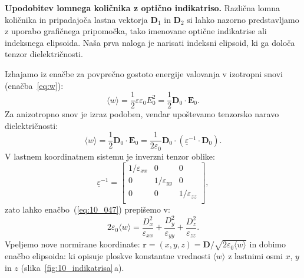 \begin{example}{\bf Upodobitev lomnega količnika z optično indikatriso.} 
\label{ex:ind}
Različna lomna količnika in pripadajoča lastna
vektorja $\mathbf{D}_1$ in $\mathbf{D}_2$ si lahko nazorno predstavljamo z uporabo
grafičnega pripomočka, tako imenovane optične indikatrise ali 
indeksnega elipsoida. Naša prva naloga je narisati indeksni elipsoid, ki ga določa
tenzor dielektričnosti. 

Izhajamo iz enačbe za povprečno gostoto energije valovanja
v izotropni snovi (enačba~\ref{eq:w}):
\begin{equation}
\langle w \rangle = \frac{1}{2} \varepsilon \varepsilon_0 E_0^2 = \frac{1}{2} 
\mathbf{D}_0 \cdot \mathbf{E}_0. 
\label{eq:10_046}
\end{equation}
Za anizotropno snov je izraz podoben, vendar upoštevamo
tenzorsko naravo dielektričnosti:
\begin{equation}
\langle w \rangle = \frac{1}{2} \mathbf{D}_0 \cdot \mathbf{E}_0 = 
\frac{1}{2\varepsilon_0}\mathbf{D}_0 \cdot \left(\underline{\varepsilon}^{-1} \cdot \mathbf{D}_0
\right)\!.
\label{eq:10_047}
\end{equation}
V lastnem koordinatnem sistemu je inverzni tenzor oblike:
\begin{equation}
\underline{\varepsilon}^{-1} = 
\left[\begin{array}{ccc}
1/\varepsilon_{xx} & 0 & 0\\
0 & 1/\varepsilon_{yy} &0\\
0 & 0 & 1/\varepsilon_{zz}\\
\end{array}\right]\!\!,
\label{eq:10_048}
\end{equation}
zato lahko enačbo~(\ref{eq:10_047}) prepišemo v:
\begin{equation}
2 \varepsilon_0 \langle w \rangle = \frac{D_{x}^2}{\varepsilon_{xx}} + 
\frac{D_{y}^2}{\varepsilon_{yy}} + \frac{D_{z}^2}{\varepsilon_{zz}}.
\label{eq:10_049}
\end{equation}
Vpeljemo nove normirane koordinate:
$\mathbf{r} = (x,y,z) = \mathbf{D}/\sqrt{2 \varepsilon_0 \langle w\rangle}$ in 
dobimo enačbo elipsoida:
ki opisuje ploskve konstantne vrednosti $\langle w \rangle$ 
z lastnimi osmi $x$, $y$ in $z$ (slika~\ref{fig:10_indikatrisa}\,a). 
\end{example}

